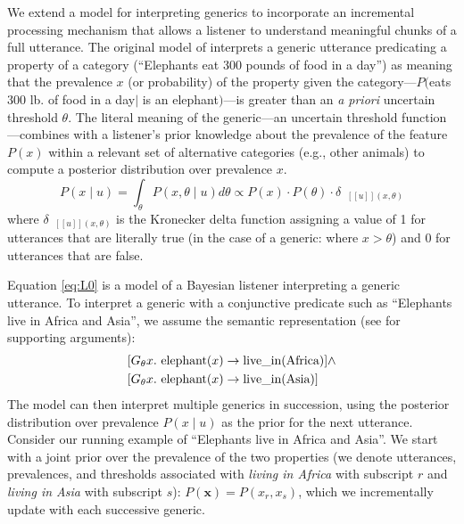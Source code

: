 \documentclass[10pt,letterpaper]{article}
\newcommand{\denote}[1]{\mbox{ $[\![ #1 ]\!]$}}
\begin{document}
We extend a model for interpreting generics to incorporate an incremental processing mechanism that allows a listener to understand meaningful chunks of a full utterance.
The original model of  interprets a generic utterance predicating a property of a category (``Elephants eat 300 pounds of food in a day'') as meaning that the prevalence $x$ (or probability) of the property given the category---$P($eats 300 lb. of food in a day$\mid$ is an elephant$)$---is greater than an \emph{a priori} uncertain threshold $\theta$.
The literal meaning of the generic---an uncertain threshold function---combines with a listener's prior knowledge about the prevalence of the feature $P(x)$ within a relevant set of alternative categories (e.g., other animals) to compute a posterior distribution over prevalence $x$. 
\begin{equation}
P(x \mid u) = \int_{\theta} P(x, \theta \mid u)  d\theta \propto P(x) \cdot P(\theta) \cdot \delta_{\denote{u}(x, \theta)} 
\label{eq:L0}
\end{equation}
\noindent where $\delta_{\denote{u}(x, \theta)}$ is the Kronecker delta function assigning a value of 1 for utterances that are literally true (in the case of a generic: where $x > \theta$) and 0 for utterances that are false.



Equation \ref{eq:L0} is a model of a Bayesian listener interpreting a generic utterance.
To interpret a generic with a conjunctive predicate such as ``Elephants live in Africa and Asia'', we assume the semantic representation (see  for supporting arguments):
\begin{equation}
\begin{split}
[G_\theta x. \textnormal{ elephant}(x)& \to \textnormal{live\_in}(\textnormal{Africa})] \land \\
[G_\theta x. \textnormal{ elephant}(x)& \to \textnormal{live\_in}(\textnormal{Asia})] 
\end{split}
\label{eq:sem}
\end{equation}
The model can then interpret multiple generics in succession, using the posterior distribution over prevalence $P(x \mid u)$ as the prior for the next utterance. 
Consider our running example of ``Elephants live in Africa and Asia''.
We start with a joint prior over the prevalence of the two properties (we denote utterances, prevalences, and thresholds associated with \emph{living in Africa} with subscript $r$ and \emph{living in Asia} with subscript $s$): $P(\textbf{x}) = P(x_{r}, x_{s})$, which we incrementally update with each successive generic. 
\end{document}
